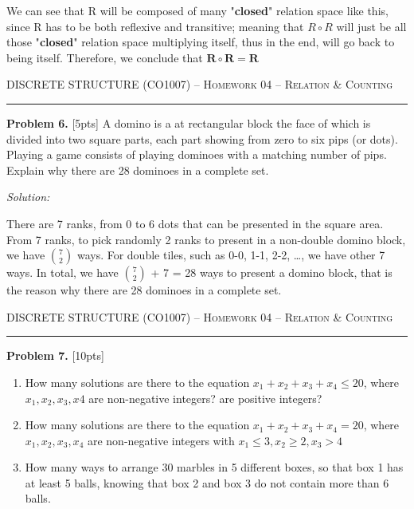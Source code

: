 \documentclass[12pt]{amsart}
\begin{document}
We can see that R will be composed of many "\textbf{closed}" relation space like this, since R has to be both reflexive and transitive; meaning that $R\circ R$ will just be all those "\textbf{closed}" relation space multiplying itself, thus in the end, will go back to being itself. Therefore, we conclude that $\mathbf{R\circ R=R}$
\newpage

{\scshape } \hfill {\scshape DISCRETE STRUCTURE (CO1007) -- Homework 04 -- Relation \& Counting} \hfill {\scshape }
 
\smallskip

\hrule

\bigskip

\bigskip 

\textbf{Problem 6. }[5pts] A domino is a 
at rectangular block the face of which is divided into two square parts,
each part showing from zero to six pips (or dots). Playing a game consists of playing dominoes with a
matching number of pips. Explain why there are 28 dominoes in a complete set.
\bigskip

\textit{Solution:}

There are 7 ranks, from 0 to 6 dots that can be presented in the square area.
From 7 ranks, to pick randomly 2 ranks to present in a non-double domino block, we have $\binom{7}{2}$ ways.
For double tiles, such as 0-0, 1-1, 2-2, …, we have other 7 ways.
In total, we have $\binom{7}{2}$ + 7 = 28 ways to present a domino block, that is the reason why there are 28 dominoes in a complete set.
\medskip

\newpage

{\scshape } \hfill {\scshape DISCRETE STRUCTURE (CO1007) -- Homework 04 -- Relation \& Counting} \hfill {\scshape }
 
\smallskip

\hrule

\bigskip

\bigskip 

\textbf{Problem 7. }[10pts] 
\begin{enumerate}
    \item How many solutions are there to the equation $x_1 + x_2 + x_3 + x_4 \leq 20$, where $x_1, x_2, x_3, x4$ are non-negative integers? are positive integers?
    \item How many solutions are there to the equation $x_1 + x_2 + x_3 + x_4 = 20$, where $x_1, x_2, x_3, x_4$ are non-negative integers with $x_1\leq 3, x_2 \geq 2, x_3 > 4$
    \item How many ways to arrange 30 marbles in 5 different boxes, so that box 1 has at least 5 balls, knowing
that box 2 and box 3 do not contain more than 6 balls.
\end{enumerate}
\bigskip
\end{document}
